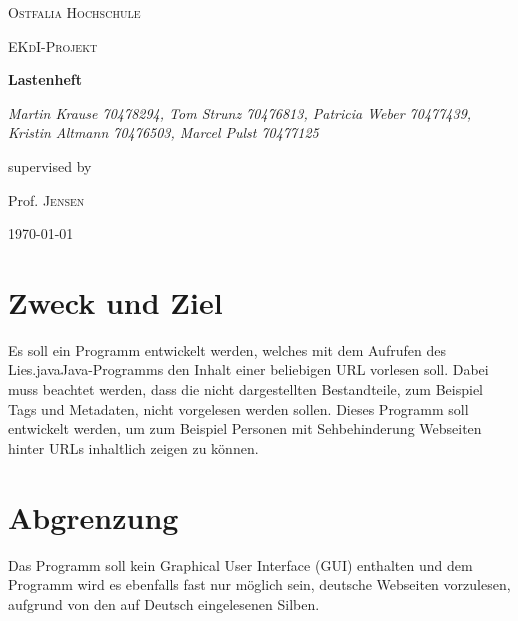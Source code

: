 \documentclass[12pt]{scrartcl}
\begin{document}
\begin{titlepage}
	\centering
	{\scshape\LARGE Ostfalia Hochschule \par}
	\vspace{1cm}
	{\scshape\Large EKdI-Projekt\par}
	\vspace{1.5cm}
	{\huge\bfseries Lastenheft\par}
	\vspace{2cm}
	{\Large\itshape Martin Krause 70478294, Tom Strunz 70476813, Patricia Weber 70477439, Kristin Altmann 70476503, Marcel Pulst 70477125\par}
	\vfill
	supervised by\par
	Prof. \textsc{Jensen}

	\vfill

	{\large \today\par}
\end{titlepage}


\tableofcontents
\newpage


\section{Zweck und Ziel}
Es soll ein Programm entwickelt werden, welches mit dem Aufrufen des \glqq Lies.java\grqq Java-Programms den Inhalt einer beliebigen URL vorlesen soll. Dabei muss beachtet werden, dass die nicht dargestellten Bestandteile, zum Beispiel Tags und Metadaten, nicht vorgelesen werden sollen. Dieses Programm soll entwickelt werden, um zum Beispiel Personen mit Sehbehinderung Webseiten hinter URLs inhaltlich zeigen zu können.

\section{Abgrenzung}
Das Programm soll kein Graphical User Interface (GUI) enthalten und dem Programm wird es ebenfalls fast nur möglich sein, deutsche Webseiten vorzulesen, aufgrund von den auf Deutsch eingelesenen Silben.
\end{document}
